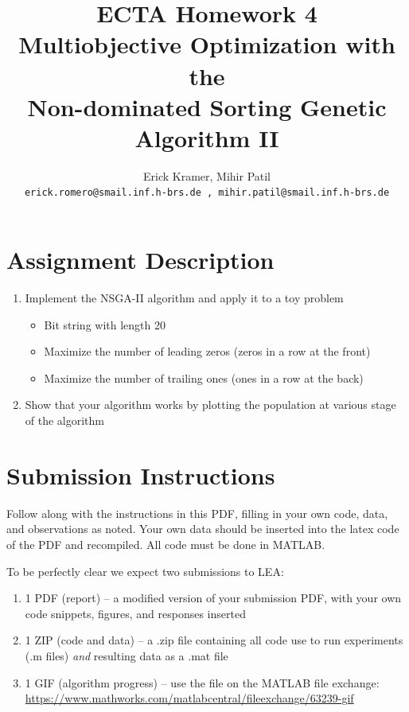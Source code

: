 \documentclass[11pt, a4paper]{article}
\title{ECTA Homework 4\\Multiobjective Optimization with the\\Non-dominated Sorting Genetic Algorithm II}
\author{\color{blue}Erick Kramer, Mihir Patil\\ \texttt{\color{blue}erick.romero@smail.inf.h-brs.de , mihir.patil@smail.inf.h-brs.de}}
\begin{document}
\maketitle


\newpage

\section{Assignment Description}
	\begin{enumerate}
		\item Implement the NSGA-II algorithm and apply it to a toy problem
			\begin{itemize}
			\item Bit string with length 20
			\item Maximize the number of leading zeros (zeros in a row at the front)
			\item Maximize the number of trailing ones (ones in a row at the back)
		\end{itemize}
		\item Show that your algorithm works by plotting the population at various stage of the algorithm
	\end{enumerate}

\section{Submission Instructions}
Follow along with the instructions in this PDF, filling in your own code, data, and observations as noted. Your own data should be inserted into the latex code of the PDF and recompiled. All code must be done in MATLAB.

To be perfectly clear we expect two submissions to LEA:
\begin{enumerate}
	\item 1 PDF (report) -- a modified version of your submission PDF, with your own code snippets, figures, and responses inserted
	\item 1 ZIP (code and data)   -- a .zip file containing all code use to run experiments (.m files) \textit{and} resulting data as a .mat file
	\item 1 GIF (algorithm progress) -- use the file on the MATLAB file exchange: \url{https://www.mathworks.com/matlabcentral/fileexchange/63239-gif}
\end{enumerate}
\end{document}
